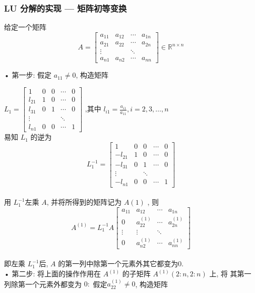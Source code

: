 \documentclass[12pt,a4paper]{article}
\begin{document}
\subsubsection{LU 分解的实现 — 矩阵初等变换}
给定一个矩阵
\begin{equation*}
	A=\left[\begin{array}{cccc}{a_{11}} & {a_{12}} & {\cdots} & {a_{1 n}} \\ {a_{21}} & {a_{22}} & {\cdots} & {a_{2 n}} \\ {\vdots} & {} & {\ddots} & {} \\ {a_{n 1}} & {a_{n 2}} & {\cdots} & {a_{n n}}\end{array}\right] \in \mathbb{R}^{n \times n}
\end{equation*}

• 第一步: 假定 $a_{11} \neq  0$, 构造矩阵

 {$L_{1}=\left[\begin{array}{ccccc}{1} & {0} & {0} & {\cdots} & {0} \\ {l_{21}} & {1} & {0} & {\cdots} & {0} \\ {l_{31}} & {0} & {1} & {\cdots} & {0} \\ {\vdots} & {} & {} & {\ddots} \\ {l_{n 1}} & {0} & {0} & {\cdots} & {1}\end{array}\right]$ $\text{,其中}$ $l_{i 1}=\frac{a_{i 1}}{a_{11}}, i=2,3, \dots, n $}
\\
易知 $L_1$ 的逆为
$$
L_{1}^{-1}=\left[\begin{array}{ccccc}{1} & {0} & {0} & {\cdots} & {0} \\ {-l_{21}} & {1} & {0} & {\cdots} & {0} \\ {-l_{31}} & {0} & {1} & {\cdots} & {0} \\ {\vdots} & {} & {\ddots} & {} \\ {-l_{n 1}} & {0} & {0} & {\cdots} & {1}\end{array}\right]
$$
\\
用 $L^{−1}_1 $左乘 $A$, 并将所得到的矩阵记为 $A(1)$
, 则
$$
A^{(1)}=L_{1}^{-1} A\left[\begin{array}{cccc}{a_{11}} & {a_{12}} & {\cdots} & {a_{1 n}} \\ {0} & {a_{22}^{(1)}} & {\cdots} & {a_{2 n}^{(1)}} \\ {\vdots} & {\vdots} & {\ddots} & {} \\ {0} & {a_{n 2}^{(1)}} & {\cdots} & {a_{n n}^{(1)}}\end{array}\right]
$$
\\
即左乘 $L^{−1}_1 $后, $A$ 的第一列中除第一个元素外其它都变为$ 0$.
\\
• 第二步: 将上面的操作作用在 $A^{(1)}$ 的子矩阵 $A^{(1)}(2 : n, 2 : n)$ 上, 将
其第一列除第一个元素外都变为 $0:$ 假定$ a^{(1)}_{22} \neq 0$, 构造矩阵
\end{document}
